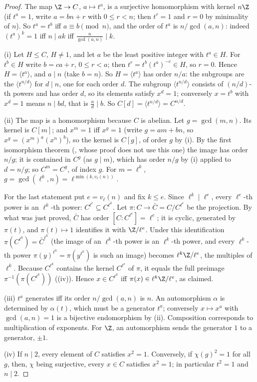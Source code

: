 \begin{proof}
The map $\Z\to C$, $a\mapsto t^a$, is a surjective homomorphism with kernel $n\Z$ (if $t^a=1$, write $a=bn+r$ with $0\le r<n$; then
$t^r=1$ and $r=0$ by minimality of $n$). So $t^a=t^b$ iff $a\equiv b\pmod n$, and the order of $t^a$ is $n/\gcd(a,n)$: indeed $(t^a)^k=1$ iff
$n\mid ak$ iff $\frac n{\gcd(a,n)}\mid k$.

(i) Let $H\le C$, $H\ne1$, and let $a$ be the least positive integer with $t^a\in H$. For $t^b\in H$ write $b=ca+r$, $0\le r<a$; then
$t^r=t^b(t^a)^{-c}\in H$, so $r=0$. Hence $H=\langle t^a\rangle$, and $a\mid n$ (take $b=n$). So $H=\langle t^a\rangle$ has order $n/a$: the subgroups are the
$\langle t^{n/d}\rangle$ for $d\mid n$, one for each order $d$. The subgroup $\langle t^{n/d}\rangle$ consists of $(n/d)$-th powers and has order $d$, so its elements
satisfy $x^d=1$; conversely $x=t^b$ with $x^d=1$ means $n\mid bd$, that is $\frac nd\mid b$. So $C[d]=\langle t^{n/d}\rangle=C^{n/d}$.

(ii) The map is a homomorphism because $C$ is abelian. Let $g=\gcd(m,n)$. Its kernel is $C[m]$; and $x^m=1$ iff $x^g=1$ (write
$g=am+bn$, so $x^g=(x^m)^a(x^n)^b$), so the kernel is $C[g]$, of order $g$ by (i). By the first isomorphism theorem
(, whose proof does not use this one) the image has order $n/g$; it is contained in $C^g$ (as $g\mid m$), which
has order $n/g$ by (i) applied to $d=n/g$; so $C^m=C^g$, of index $g$. For $m=\ell^k$, $g=\gcd(\ell^k,n)=\ell^{\min(k,v_\ell(n))}$.

For the last statement put $e=v_\ell(n)$ and fix $k\le e$. Since $\ell^k\mid\ell^e$, every $\ell^e$-th power is an $\ell^k$-th power: $C^{\ell^e}\subseteq C^{\ell^k}$.
Let $\pi\colon C\to\bar C=C/C^{\ell^e}$ be the projection. By what was just proved, $\bar C$ has order $[C:C^{\ell^e}]=\ell^e$; it is cyclic, generated by $\pi(t)$,
and $\pi(t)\mapsto1$ identifies it with $\Z/\ell^e$. Under this identification $\pi(C^{\ell^k})=\bar C^{\ell^k}$ (the image of an $\ell^k$-th power is an $\ell^k$-th power,
and every $\ell^k$-th power $\pi(y)^{\ell^k}=\pi(y^{\ell^k})$ is such an image) becomes $\ell^k\Z/\ell^e$, the multiples of $\ell^k$. Because $C^{\ell^k}$ contains the kernel
$C^{\ell^e}$ of $\pi$, it equals the full preimage $\pi^{-1}(\pi(C^{\ell^k}))$ ((iv)). Hence $x\in C^{\ell^k}$ iff $\pi(x)\in\ell^k\Z/\ell^e$, as claimed.

(iii) $t^a$ generates iff its order $n/\gcd(a,n)$ is $n$. An automorphism $\alpha$ is determined by $\alpha(t)$, which must be a generator
$t^a$; conversely $x\mapsto x^a$ with $\gcd(a,n)=1$ is a bijective endomorphism by (ii). Composition corresponds to multiplication of
exponents. For $\Z$, an automorphism sends the generator $1$ to a generator, $\pm1$.

(iv) If $n\mid2$, every element of $C$ satisfies $x^2=1$. Conversely, if $\chi(g)^2=1$ for all $g$, then, $\chi$ being surjective, every
$x\in C$ satisfies $x^2=1$; in particular $t^2=1$ and $n\mid2$.
\end{proof}

